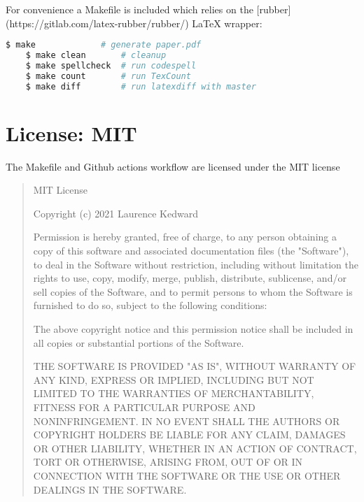 \documentclass[]{article}
\begin{document}
For convenience a Makefile is included which relies on the [rubber](https://gitlab.com/latex-rubber/rubber/) LaTeX wrapper:


\begin{center}
	\begin{lstlisting}[language=Bash,morekeywords={make}]
	$ make             # generate paper.pdf
	$ make clean       # cleanup
	$ make spellcheck  # run codespell
	$ make count       # run TexCount
	$ make diff        # run latexdiff with master
	\end{lstlisting}
\end{center}


\section{License: MIT}

The Makefile and Github actions workflow are licensed under the MIT license

\begin{quote}
	MIT License
	
	Copyright (c) 2021 Laurence Kedward
	
	Permission is hereby granted, free of charge, to any person obtaining a copy
	of this software and associated documentation files (the "Software"), to deal
	in the Software without restriction, including without limitation the rights
	to use, copy, modify, merge, publish, distribute, sublicense, and/or sell
	copies of the Software, and to permit persons to whom the Software is
	furnished to do so, subject to the following conditions:
	
	The above copyright notice and this permission notice shall be included in all
	copies or substantial portions of the Software.
	
	THE SOFTWARE IS PROVIDED "AS IS", WITHOUT WARRANTY OF ANY KIND, EXPRESS OR
	IMPLIED, INCLUDING BUT NOT LIMITED TO THE WARRANTIES OF MERCHANTABILITY,
	FITNESS FOR A PARTICULAR PURPOSE AND NONINFRINGEMENT. IN NO EVENT SHALL THE
	AUTHORS OR COPYRIGHT HOLDERS BE LIABLE FOR ANY CLAIM, DAMAGES OR OTHER
	LIABILITY, WHETHER IN AN ACTION OF CONTRACT, TORT OR OTHERWISE, ARISING FROM,
	OUT OF OR IN CONNECTION WITH THE SOFTWARE OR THE USE OR OTHER DEALINGS IN THE
	SOFTWARE.
\end{quote}
\end{document}
